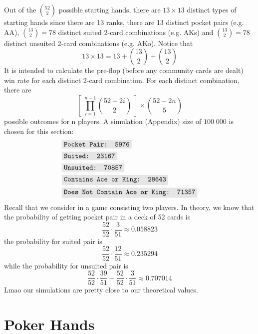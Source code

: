 \documentclass{article}
\newcommand{\code}[1]{\colorbox{codegray}{\texttt{#1}}}
\begin{document}
Out of the $\displaystyle \binom{52}{2}$ possible starting hands, there 
are $13 \times 13$ distinct types of starting hands since there are 13 
ranks, there are 13 distinct pocket pairs (e.g. AA), $\displaystyle 
\binom{13}{2} = 78$ distinct suited 2-card combinations (e.g. AKs) 
and $\displaystyle \binom{13}{2} = 78$ distinct unsuited 2-card 
combinations (e.g. AKo). Notice that 
\[
    13 \times 13 = 13 + \binom{13}{2} + \binom{13}{2}
\]
It is intended to calculate the pre-flop 
(before any community cards are dealt) win rate for each distinct 
2-card combination. For each distinct combination, there are 
\[
    \left[ \; \prod_{i = 1}^{n - 1} \binom{52 - 2i}{2} \; \right] \times \binom{52 - 2n}{5}
\] 
possible outcomes for n players. A simulation (Appendix) 
size of $100 \; 000$ is chosen for this section:
\begin{align*}
    & \code{Pocket Pair: 5976} \\
    & \code{Suited: 23167} \\
    & \code{Unsuited: 70857} \\
    & \code{Contains Ace or King: 28643} \\
    & \code{Does Not Contain Ace or King: 71357}
\end{align*}
Recall that we consider in a game consisting two players. In theory, we 
know that the probability of getting pocket pair in a deck of 52 cards is
\[
    \frac{52}{52} \cdot \frac{3}{51} \approx \boxed{0.058823}
\]
the probability for suited pair is 
\[
    \frac{52}{52} \cdot \frac{12}{51} \approx \boxed{0.235294}
\]
while the probability for unsuited pair is 
\[
    \frac{52}{52} \cdot \frac{39}{51} - \frac{52}{52} \cdot \frac{3}{51} 
    \approx \boxed{0.707014}
\]
Lmao our simulations are pretty close to our theoretical values. 


\section*{Poker Hands}
\end{document}
